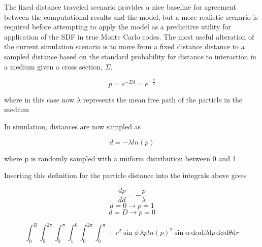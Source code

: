 

The fixed distance traveled scenario provides a nice baseline for agreement
between the computational results and the model, but a more realistic scenario
is required before attempting to apply the model as a predicitive utility for
application of the SDF in true Monte Carlo codes. The most useful alteration of
the current simulation scenario is to move from a fixed distance distance to a
sampled distance based on the standard probability for distance to interaction
in a medium given a cross section, $\Sigma$.

$$ p = e^{-\Sigma d} = e^{-\frac{d}{\lambda}} $$

where in this case now $\lambda$ represents the mean free path of the particle in the medium

In simulation, distances are now sampled as

$$ d = -\lambda ln(p) $$

where p is randomly sampled with a uniform distribution between 0 and 1

Inserting this definition for the particle distance into the integrals above
gives

$$ \frac{dp}{dd} = -\frac{p}{\lambda} $$
$$ d = 0 \rightarrow p = 1 $$
$$ d = D \rightarrow p = 0 $$

$$ \int_{0}^{R}\int_{0}^{2\pi}\int_{0}^{\pi}\int_{1}^{0}\int_{0}^{2\pi}\int_{0}^{\pi}
-r^2\sin{\phi} \, \lambda p ln(p)^2 \sin{\alpha} \, \mathrm{d}\alpha \mathrm{d}\beta \mathrm{d}p \, \mathrm{d}\phi
\mathrm{d}\theta \mathrm{d}r $$

